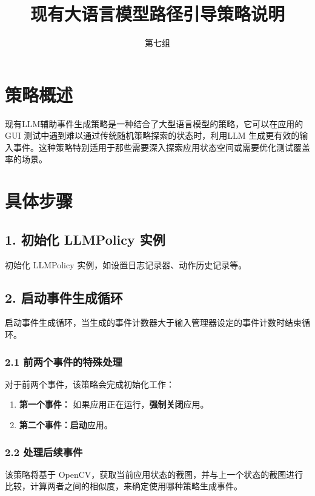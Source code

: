 \documentclass{article}[UTF8, fontset=windows]
\title{现有大语言模型路径引导策略说明}
\author{第七组}
\date{}
\begin{document}
\maketitle

\section*{策略概述}

现有LLM辅助事件生成策略是一种结合了大型语言模型的策略，它可以在应用的GUI 测试中遇到难以通过传统随机策略探索的状态时，利用LLM 生成更有效的输入事件。这种策略特别适用于那些需要深入探索应用状态空间或需要优化测试覆盖率的场景。

\section*{具体步骤}

\subsection*{1. 初始化 LLMPolicy 实例}
初始化 LLMPolicy 实例，如设置日志记录器、动作历史记录等。

\subsection*{2. 启动事件生成循环}
启动事件生成循环，当生成的事件计数器大于输入管理器设定的事件计数时结束循环。

\subsubsection*{2.1 前两个事件的特殊处理}
对于前两个事件，该策略会完成初始化工作：
\begin{enumerate}[leftmargin=2em]
    \item \textbf{第一个事件：} 如果应用正在运行，\textbf{强制关闭}应用。
    \item \textbf{第二个事件：}\textbf{启动}应用。
\end{enumerate}

\subsubsection*{2.2 处理后续事件}
该策略将基于 OpenCV，获取当前应用状态的截图，并与上一个状态的截图进行比较，计算两者之间的相似度，来确定使用哪种策略生成事件。
\end{document}
